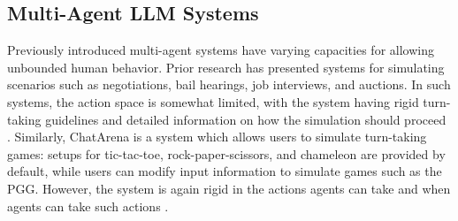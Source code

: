 




\subsection{Multi-Agent LLM Systems}

Previously introduced multi-agent systems have varying capacities for allowing unbounded human behavior. Prior research has presented systems for simulating scenarios such as negotiations, bail hearings, job interviews, and auctions. In such systems, the action space is somewhat limited, with the system having rigid turn-taking guidelines and detailed information on how the simulation should proceed \cite{manning2024automated}. Similarly, ChatArena is a system which allows users to simulate turn-taking games: setups for tic-tac-toe, rock-paper-scissors, and chameleon are provided by default, while users can modify input information to simulate games such as the PGG. However, the system is again rigid in the actions agents can take and when agents can take such actions \cite{ChatArena}.

